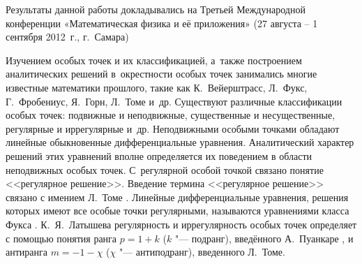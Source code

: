 



\date{04/VII/2013} %




\maketitle

{\small \noindent Результаты данной работы докладывались на Третьей Международной конференции «Математическая физика и её приложения» (27 августа -- 1 сентября 2012~г., г.~Самара)}

\bigskip

 Изучением особых точек и их классификацией, а~также построением аналитических решений в~окрестности особых точек занимались многие известные математики
прошлого, такие как К.~Вейерштрасс, Л.~Фукс, Г.~Фробениус, Я.~Горн, Л.~Томе и~др. 
Существуют различные классификации особых точек: подвижные и неподвижные, существенные и несущественные, регулярные и иррегулярные и~др. 
Неподвижными особыми точками обладают линейные обыкновенные дифференциальные уравнения. 
Аналитический характер решений этих уравнений вполне определяется их поведением в области
неподвижных особых точек. 
С~регулярной особой точкой связано понятие <<регулярное решение>>. 
Введение термина <<регулярное решение>> связано с имением Л.~Томе \cite{tas:bib:1}. 
Линейные дифференциальные уравнения, решения которых имеют все особые точки регулярными, называются уравнениями класса Фукса \cite{tas:bib:2}. 
К.~Я.~Латышева регулярность и иррегулярность особых точек определяет \cite{tas:bib:3} с помощью понятия
ранга $p=1+k$ ($k$ "--- подранг), введённого А.~Пуанкаре \cite{tas:bib:4}, и антиранга $m=-1-\chi$ ($\chi$ "--- антиподранг), введенного Л.~Томе.

